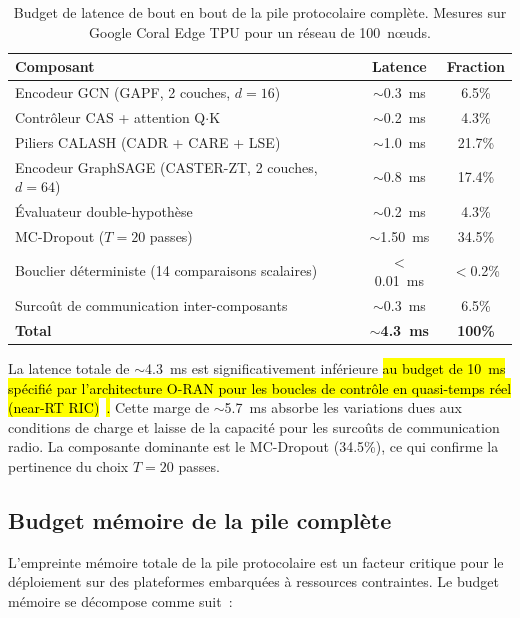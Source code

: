 \begin{table}[htbp]
\centering
\caption{Budget de latence de bout en bout de la pile protocolaire complète. Mesures sur Google Coral Edge TPU pour un réseau de 100~n\oe{}uds.}
\label{tab:latency-budget}
\begin{tabular}{lcc}
\toprule
\textbf{Composant} & \textbf{Latence} & \textbf{Fraction} \\
\midrule
Encodeur GCN (GAPF, 2 couches, $d=16$) & $\sim$0.3~ms & 6.5\% \\
Contrôleur CAS + attention Q$\cdot$K & $\sim$0.2~ms & 4.3\% \\
Piliers CALASH (CADR + CARE + LSE) & $\sim$1.0~ms & 21.7\% \\
Encodeur GraphSAGE (CASTER-ZT, 2 couches, $d=64$) & $\sim$0.8~ms & 17.4\% \\
Évaluateur double-hypothèse & $\sim$0.2~ms & 4.3\% \\
MC-Dropout ($T=20$ passes) & $\sim$1.50~ms & 34.5\% \\
Bouclier déterministe (14 comparaisons scalaires) & $<$0.01~ms & $<$0.2\% \\
Surcoût de communication inter-composants & $\sim$0.3~ms & 6.5\% \\
\midrule
\textbf{Total} & $\sim$\textbf{4.3~ms} & \textbf{100\%} \\
\bottomrule
\end{tabular}
\end{table}

\noindent La latence totale de $\sim$4.3~ms est significativement inférieure \hl{au budget de 10~ms spécifié par l'architecture O-RAN pour les boucles de contrôle en quasi-temps réel (near-RT RIC)}~\cite{polese2023oran}\hl{.} Cette marge de $\sim$5.7~ms absorbe les variations dues aux conditions de charge et laisse de la capacité pour les surcoûts de communication radio. La composante dominante est le MC-Dropout (34.5\%), ce qui confirme la pertinence du choix $T = 20$ passes.

\subsection{Budget mémoire de la pile complète}

L'empreinte mémoire totale de la pile protocolaire est un facteur critique pour le déploiement sur des plateformes embarquées à ressources contraintes. Le budget mémoire se décompose comme suit~:

